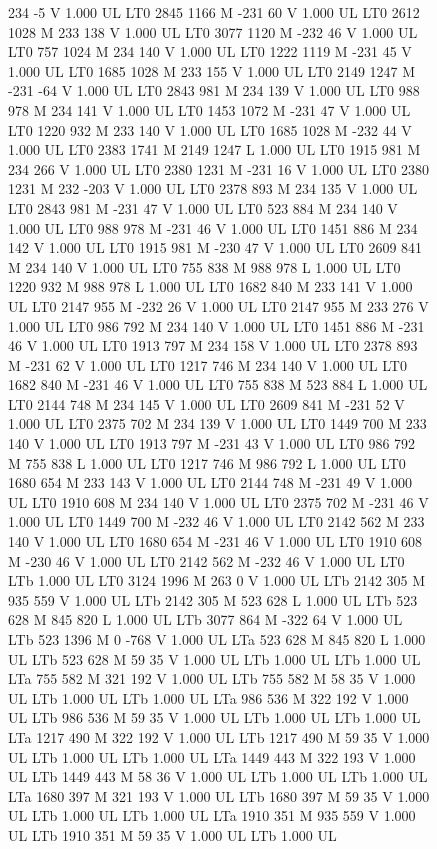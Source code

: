 \documentclass{LMCS}
\begin{document}
\begin{figure}[!tbp]
\begin{minipage}[b]{.45\linewidth}
{{{234 -5 V
1.000 UL
LT0
2845 1166 M
-231 60 V
1.000 UL
LT0
2612 1028 M
233 138 V
1.000 UL
LT0
3077 1120 M
-232 46 V
1.000 UL
LT0
757 1024 M
234 140 V
1.000 UL
LT0
1222 1119 M
-231 45 V
1.000 UL
LT0
1685 1028 M
233 155 V
1.000 UL
LT0
2149 1247 M
-231 -64 V
1.000 UL
LT0
2843 981 M
234 139 V
1.000 UL
LT0
988 978 M
234 141 V
1.000 UL
LT0
1453 1072 M
-231 47 V
1.000 UL
LT0
1220 932 M
233 140 V
1.000 UL
LT0
1685 1028 M
-232 44 V
1.000 UL
LT0
2383 1741 M
2149 1247 L
1.000 UL
LT0
1915 981 M
234 266 V
1.000 UL
LT0
2380 1231 M
-231 16 V
1.000 UL
LT0
2380 1231 M
232 -203 V
1.000 UL
LT0
2378 893 M
234 135 V
1.000 UL
LT0
2843 981 M
-231 47 V
1.000 UL
LT0
523 884 M
234 140 V
1.000 UL
LT0
988 978 M
-231 46 V
1.000 UL
LT0
1451 886 M
234 142 V
1.000 UL
LT0
1915 981 M
-230 47 V
1.000 UL
LT0
2609 841 M
234 140 V
1.000 UL
LT0
755 838 M
988 978 L
1.000 UL
LT0
1220 932 M
988 978 L
1.000 UL
LT0
1682 840 M
233 141 V
1.000 UL
LT0
2147 955 M
-232 26 V
1.000 UL
LT0
2147 955 M
233 276 V
1.000 UL
LT0
986 792 M
234 140 V
1.000 UL
LT0
1451 886 M
-231 46 V
1.000 UL
LT0
1913 797 M
234 158 V
1.000 UL
LT0
2378 893 M
-231 62 V
1.000 UL
LT0
1217 746 M
234 140 V
1.000 UL
LT0
1682 840 M
-231 46 V
1.000 UL
LT0
755 838 M
523 884 L
1.000 UL
LT0
2144 748 M
234 145 V
1.000 UL
LT0
2609 841 M
-231 52 V
1.000 UL
LT0
2375 702 M
234 139 V
1.000 UL
LT0
1449 700 M
233 140 V
1.000 UL
LT0
1913 797 M
-231 43 V
1.000 UL
LT0
986 792 M
755 838 L
1.000 UL
LT0
1217 746 M
986 792 L
1.000 UL
LT0
1680 654 M
233 143 V
1.000 UL
LT0
2144 748 M
-231 49 V
1.000 UL
LT0
1910 608 M
234 140 V
1.000 UL
LT0
2375 702 M
-231 46 V
1.000 UL
LT0
1449 700 M
-232 46 V
1.000 UL
LT0
2142 562 M
233 140 V
1.000 UL
LT0
1680 654 M
-231 46 V
1.000 UL
LT0
1910 608 M
-230 46 V
1.000 UL
LT0
2142 562 M
-232 46 V
1.000 UL
LT0
LTb
1.000 UL
LT0
3124 1996 M
263 0 V
1.000 UL
LTb
2142 305 M
935 559 V
1.000 UL
LTb
2142 305 M
523 628 L
1.000 UL
LTb
523 628 M
845 820 L
1.000 UL
LTb
3077 864 M
-322 64 V
1.000 UL
LTb
523 1396 M
0 -768 V
1.000 UL
LTa
523 628 M
845 820 L
1.000 UL
LTb
523 628 M
59 35 V
1.000 UL
LTb
1.000 UL
LTb
1.000 UL
LTa
755 582 M
321 192 V
1.000 UL
LTb
755 582 M
58 35 V
1.000 UL
LTb
1.000 UL
LTb
1.000 UL
LTa
986 536 M
322 192 V
1.000 UL
LTb
986 536 M
59 35 V
1.000 UL
LTb
1.000 UL
LTb
1.000 UL
LTa
1217 490 M
322 192 V
1.000 UL
LTb
1217 490 M
59 35 V
1.000 UL
LTb
1.000 UL
LTb
1.000 UL
LTa
1449 443 M
322 193 V
1.000 UL
LTb
1449 443 M
58 36 V
1.000 UL
LTb
1.000 UL
LTb
1.000 UL
LTa
1680 397 M
321 193 V
1.000 UL
LTb
1680 397 M
59 35 V
1.000 UL
LTb
1.000 UL
LTb
1.000 UL
LTa
1910 351 M
935 559 V
1.000 UL
LTb
1910 351 M
59 35 V
1.000 UL
LTb
1.000 UL
}}}
\end{minipage}
\end{figure}
\end{document}
